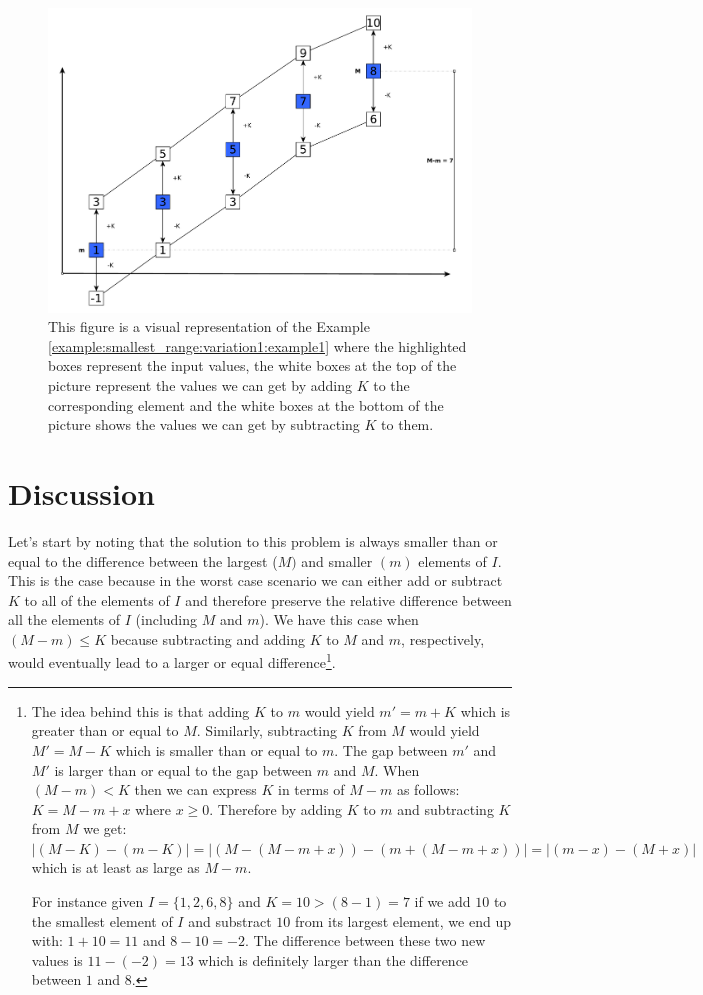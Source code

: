 	\begin{figure}
		\centering
		\includegraphics[width=1\linewidth]{sources/smallest_range/images/bars}
		\caption{This figure is a visual representation of the Example \ref{example:smallest_range:variation1:example1}
		where the highlighted boxes represent the input values, the white boxes at the top of
		the picture represent the values we can get by adding $K$ to the corresponding element and the
		white boxes at the bottom of the picture shows the values we can get by subtracting $K$ to
		them.}
		\label{fig:smallest_range:bars_full}
	\end{figure}

\section{Discussion}
\label{smallest_range:sec:discussion}
Let's start by noting that the solution to this problem is always smaller than or equal to the
difference between the largest ($M)$ and smaller  $(m)$ elements of $I$. This is the case because in
the worst case scenario we can either add or subtract $K$ to all of the elements of $I$ and therefore
preserve the relative difference between all the elements of $I$ (including $M$ and $m$). We have
this case when $(M-m) \leq K$ because subtracting and adding $K$ to $M$ and $m$, respectively, would
eventually lead to a larger or equal difference\footnote{The idea behind this is that adding
$K$ to $m$ would yield $m' = m+K$ which is greater than or equal to $M$. Similarly, subtracting $K$ from
$M$ would yield $M' = M-K$ which is smaller than or equal to $m$. The gap between $m'$ and $M'$ is
larger than or equal to the gap between $m$ and $M$. When $(M-m) < K$ then we can express $K$ in terms
of $M-m$ as follows: $K = M-m + x$ where $x \geq 0$. Therefore by adding $K$ to $m$ and subtracting
$K$ from $M$ we get: $|(M-K) - (m-K)| = |(M-(M-m + x)) - (m + (M-m + x))| = |(m-x) - (M+x)|$ which is
at least as large as $M-m$.

For instance given $I = \{1,2,6,8\}$ and $K = 10 > (8-1) = 7$ if we add $10$ to the smallest element
of $I$ and substract $10$ from its largest element, we end up with: $1+10 = 11$ and $8-10=-2$. The difference
between these two new values is $11-(-2) = 13$ which is definitely larger than the difference
between $1$ and $8$.}.

